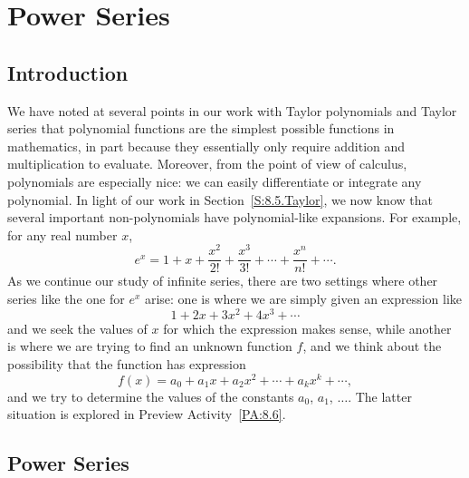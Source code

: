 \section{Power Series} \label{S:8.6.PowerSeries}

\vspace*{-14 pt}



\subsection*{Introduction}

We have noted at several points in our work with Taylor polynomials and Taylor series that polynomial functions are the simplest possible functions in mathematics, in part because  they essentially only require addition and multiplication to evaluate.  Moreover, from the point of view of calculus, polynomials are especially nice:  we can easily differentiate or integrate any polynomial.  In light of our work in Section~\ref{S:8.5.Taylor}, we now know that several important non-polynomials have polynomial-like expansions.  For example, for any real number $x$, 
$$e^x = 1 + x + \frac{x^2}{2!} + \frac{x^3}{3!} + \cdots + \frac{x^n}{n!} + \cdots.$$
As we continue our study of infinite series, there are two settings where other series like the one for $e^x$ arise:  one is where we are simply given an expression like $$1 + 2x + 3x^2 + 4x^3 + \cdots$$
and we seek the values of $x$ for which the expression makes sense, while another is where we are trying to find an unknown function $f$, and we think about the possibility that the function has expression
$$f(x) = a_0 + a_1 x + a_2 x^2 + \cdots + a_k x^k + \cdots,$$
and we try to determine the values of the constants $a_0$, $a_1$, $\ldots$.  The latter situation is explored in Preview Activity~\ref{PA:8.6}.



\subsection*{Power Series} 

